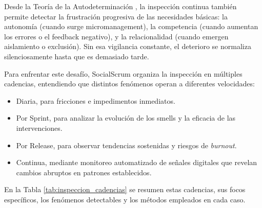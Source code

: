 Desde la Teoría de la Autodeterminación \cite{ryan_self-determination_2000}, la inspección continua también permite detectar la frustración progresiva de las necesidades básicas:
la autonomía (cuando surge micromanagement), la competencia (cuando aumentan los errores o el feedback negativo), y la relacionalidad (cuando emergen aislamiento o exclusión).
Sin esa vigilancia constante, el deterioro se normaliza silenciosamente hasta que es demasiado tarde.

Para enfrentar este desafío, SocialScrum organiza la inspección en múltiples cadencias, entendiendo que distintos fenómenos operan a diferentes velocidades:
\begin{itemize}
    \item Diaria, para fricciones e impedimentos inmediatos.
    \item Por Sprint, para analizar la evolución de los smells y la eficacia de las intervenciones.
    \item Por Release, para observar tendencias sostenidas y riesgos de \textit{burnout}.
    \item Continua, mediante monitoreo automatizado de señales digitales que revelan cambios abruptos en patrones establecidos.
\end{itemize}

En la Tabla \ref{tab:inspeccion_cadencias} se resumen estas cadencias, sus focos específicos, los fenómenos detectables y los métodos empleados en cada caso.

\begingroup
\scriptsize
\renewcommand{\arraystretch}{1.4}

\setlength{\tabcolsep}{4pt}
\setlength{\LTleft}{0pt}
\setlength{\LTright}{0pt}

